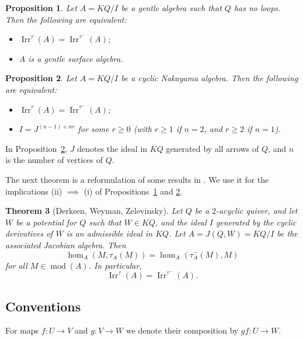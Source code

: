 \documentclass[12pt,reqno]{amsart}
\newtheorem{Thm}{Theorem}[section]
\newtheorem{Prop}[Thm]{Proposition}
\theoremstyle{definition}
\newcommand{\df}{\colon}
\newcommand{\md}{\operatorname{mod}}
\newcommand{\irr}{\operatorname{Irr}}
\begin{document}
\begin{Prop}\label{prop:main7}
Let $A = KQ/I$ be a gentle algebra such that $Q$ has no loops.
Then the following are equivalent:
\begin{itemize}\itemsep2mm

\item[(i)]
$\irr^\tau(A) = \irr^{\tau^-}(A)$;

\item[(ii)]
$A$ is a gentle surface algebra.

\end{itemize}
\end{Prop}


\begin{Prop}\label{prop:main8}
Let $A = KQ/I$ be a cyclic Nakayama algebra.
Then the following are equivalent:
\begin{itemize}\itemsep2mm

\item[(i)]
$\irr^\tau(A) = \irr^{\tau^-}(A)$;

\item[(ii)]
$I = J^{(n-1) + nr}$ for some $r \ge 0$ (with $r \ge 1$ if
$n=2$, and $r \ge 2$ if $n=1$).

\end{itemize}
\end{Prop}

In Proposition~\ref{prop:main8}, $J$ denotes the ideal in $KQ$ generated by all arrows of $Q$, and $n$ is the number of vertices
of $Q$.


The next theorem is a reformulation of
some results
in \cite[Section~10]{DWZ10}.
We use it for
the implications (ii) $\implies$ (i) of Propositions~\ref{prop:main7} and \ref{prop:main8}.

\begin{Thm}[Derksen, Weyman, Zelevinsky]
Let $Q$ be a $2$-acyclic quiver, and let $W$ be a potential
for $Q$ such that $W \in KQ$, and the ideal $I$ generated by the cyclic derivatives of
$W$ is an admissible ideal in $KQ$.
Let $A = J(Q,W) = KQ/I$ be the associated Jacobian algebra.
Then
$$
\hom_A(M,\tau_A(M)) = \hom_A(\tau_A^-(M),M)
$$
for all $M \in \md(A)$.
In particular,
$$
\irr^\tau(A) = \irr^{\tau^-}(A).
$$
\end{Thm}


\subsection{Conventions}
For maps $f\df U \to V$ and $g\df V \to W$ we denote their
composition by $gf\df U \to W$.
\end{document}
